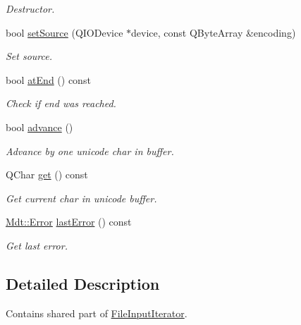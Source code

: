 \begin{DoxyCompactItemize}
\begin{DoxyCompactList}\small\item\em Destructor. \end{DoxyCompactList}\item 
bool \hyperlink{class_mdt_1_1_plain_text_1_1_file_input_iterator_shared_data_afdd5aec3bbdda3e55e11bf8a09c2fbff}{set\+Source} (Q\+I\+O\+Device $\ast$device, const Q\+Byte\+Array \&encoding)
\begin{DoxyCompactList}\small\item\em Set source. \end{DoxyCompactList}\item 
bool \hyperlink{class_mdt_1_1_plain_text_1_1_file_input_iterator_shared_data_a588463721c160b7132b1d8ecbf94e0c3}{at\+End} () const 
\begin{DoxyCompactList}\small\item\em Check if end was reached. \end{DoxyCompactList}\item 
bool \hyperlink{class_mdt_1_1_plain_text_1_1_file_input_iterator_shared_data_a734dd9507b4d12060516c1d37d0d8dc6}{advance} ()
\begin{DoxyCompactList}\small\item\em Advance by one unicode char in buffer. \end{DoxyCompactList}\item 
Q\+Char \hyperlink{class_mdt_1_1_plain_text_1_1_file_input_iterator_shared_data_a95213b7621f220618e8c67bc4f5f7bfc}{get} () const 
\begin{DoxyCompactList}\small\item\em Get current char in unicode buffer. \end{DoxyCompactList}\item 
\hyperlink{class_mdt_1_1_error}{Mdt\+::\+Error} \hyperlink{class_mdt_1_1_plain_text_1_1_file_input_iterator_shared_data_a250ee77491bce6036150de5219e62d32}{last\+Error} () const \hypertarget{class_mdt_1_1_plain_text_1_1_file_input_iterator_shared_data_a250ee77491bce6036150de5219e62d32}{}\label{class_mdt_1_1_plain_text_1_1_file_input_iterator_shared_data_a250ee77491bce6036150de5219e62d32}

\begin{DoxyCompactList}\small\item\em Get last error. \end{DoxyCompactList}\end{DoxyCompactItemize}


\subsection{Detailed Description}
Contains shared part of \hyperlink{struct_mdt_1_1_plain_text_1_1_file_input_iterator}{File\+Input\+Iterator}. 

